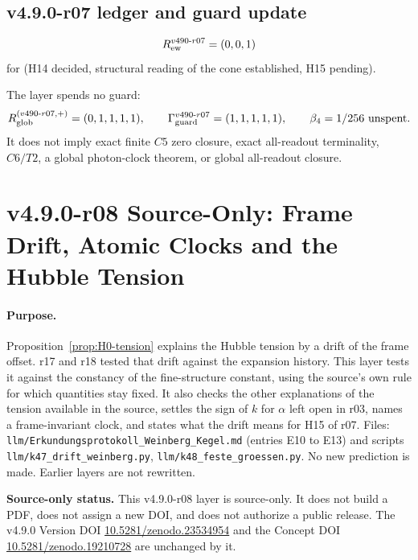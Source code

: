 \subsection*{v4.9.0-r07 ledger and guard update}
\label{subsec:v490-r07-ledger-guard}

\[
R_{\rm ew}^{v490\text{-}r07}=(0,0,1)
\]
for (H14 decided, structural reading of the cone established, H15 pending).

The layer spends no guard:
\[
R_{\rm glob}^{(v490\text{-}r07,+)}=(0,1,1,1,1),
\qquad
\Gamma_{\rm guard}^{v490\text{-}r07}=(1,1,1,1,1),
\qquad
\beta_4=1/256\ \text{unspent}.
\]
It does not imply exact finite \(C5\) zero closure, exact all-readout terminality,
\(C6/T2\), a global photon-clock theorem, or global all-readout closure.

\clearpage
\section*{v4.9.0-r08 Source-Only: Frame Drift, Atomic Clocks and the Hubble Tension}
\label{sec:v490-r08-drift-clocks-hubble}

\paragraph{Purpose.}
Proposition~\ref{prop:H0-tension} explains the Hubble tension by a drift of the frame offset.  r17 and r18 tested that
drift against the expansion history.  This layer tests it against the constancy of the fine-structure constant, using
the source's own rule for which quantities stay fixed.  It also checks the other explanations of the tension available
in the source, settles the sign of \(k\) for \(\alpha\) left open in r03, names a frame-invariant clock, and states what
the drift means for H15 of r07.  Files: \texttt{llm/Erkundungsprotokoll\_Weinberg\_Kegel.md} (entries E10 to E13) and
scripts \texttt{llm/k47\_drift\_weinberg.py}, \texttt{llm/k48\_feste\_groessen.py}.  No new prediction is made.  Earlier
layers are not rewritten.

\noindent\textbf{Source-only status.}
This v4.9.0-r08 layer is source-only.  It does not build a PDF, does not assign a new DOI,
and does not authorize a public release.  The v4.9.0 Version DOI
\href{https://doi.org/10.5281/zenodo.23534954}{10.5281/zenodo.23534954} and the Concept DOI
\href{https://doi.org/10.5281/zenodo.19210728}{10.5281/zenodo.19210728} are unchanged by it.

